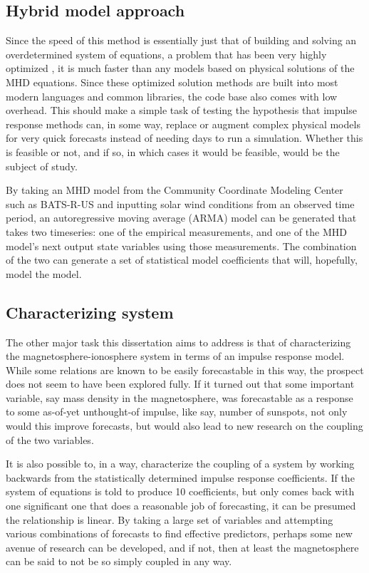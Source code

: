 \documentclass[10pt]{article}
\begin{document}
\subsection{Hybrid model approach}
Since the speed of this method is essentially just that of building and solving an overdetermined system of equations, a problem that has been very highly optimized \citep{LP}, it is much faster than any models based on physical solutions of the MHD equations. Since these optimized solution methods are built into most modern languages and common libraries, the code base also comes with low overhead. This should make a simple task of testing the hypothesis that impulse response methods can, in some way, replace or augment complex physical models for very quick forecasts instead of needing days to run a simulation. Whether this is feasible or not, and if so, in which cases it would be feasible, would be the subject of study.

By taking an MHD model from the Community Coordinate Modeling Center \citep{CCMC} such as BATS-R-US and inputting solar wind conditions from an observed time period, an autoregressive moving average (ARMA) model can be generated that takes two timeseries: one of the empirical measurements, and one of the MHD model's next output state variables using those measurements. The combination of the two can generate a set of statistical model coefficients that will, hopefully, model the model.

\subsection{Characterizing system}
The other major task this dissertation aims to address is that of characterizing the magnetosphere-ionosphere system in terms of an impulse response model. While some relations are known to be easily forecastable in this way, the prospect does not seem to have been explored fully. If it turned out that some important variable, say mass density in the magnetosphere, was forecastable as a response to some as-of-yet unthought-of impulse, like say, number of sunspots, not only would this improve forecasts, but would also lead to new research on the coupling of the two variables.

It is also possible to, in a way, characterize the coupling of a system by working backwards from the statistically determined impulse response coefficients. If the system of equations is told to produce 10 coefficients, but only comes back with one significant one that does a reasonable job of forecasting, it can be presumed the relationship is linear. By taking a large set of variables \citep{Denton} and attempting various combinations of forecasts to find effective predictors, perhaps some new avenue of research can be developed, and if not, then at least the magnetosphere can be said to not be so simply coupled in any way. 
\end{document}
